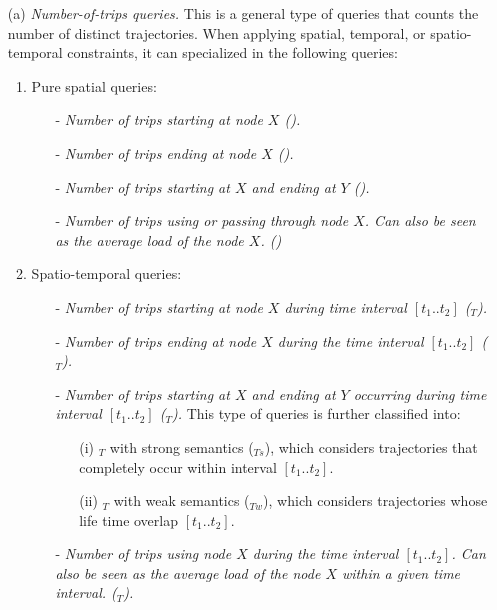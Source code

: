 	\begin{itemize}
		\item[(a)] {\em Number-of-trips queries.} This is a general type of queries that counts the number of distinct trajectories. When applying spatial, temporal, or spatio-temporal constraints, it can specialized in the following queries:
		
		\begin{enumerate}
			\item Pure spatial queries:
			\begin{itemize}
				\item[-] {\em Number of trips starting at node $X$ (\startX).}
				\item[-] {\em Number of trips ending at node $X$ (\endX).} 
				\item[-] {\em Number of trips starting at $X$ and ending at $Y$ (\XtoY).}
				\item[-] {\em Number of trips using or passing through node $X$. Can also be seen as the average load of the node $X$. (\loadX)}
			\end{itemize}
			
			\item Spatio-temporal queries:
			\begin{itemize}
				\item[-] {\em Number of trips starting at node $X$ during time interval $[t_1..t_2]$ (\startX$_T$).}
				\item[-] {\em Number of trips ending at node $X$ during the time interval $[t_1..t_2]$ (\endX$_T$). }
				\item[-] {\em Number of trips starting at $X$ and ending at $Y$ occurring during  time interval $[t_1..t_2]$ (\XtoY$_T$).} This type of queries is further classified into: 
				\begin{itemize}
				    \item[(i)] \XtoY$_T$ with strong semantics (\XtoY$_{Ts}$), which considers trajectories that completely occur within interval $[t_1..t_2]$.
				    \item[(ii)] \XtoY$_T$ with weak semantics (\XtoY$_{Tw}$), which considers trajectories whose life time overlap $[t_1..t_2]$.
				\end{itemize}
				\item[-] {\em Number of trips using node $X$ during the time interval $[t_1..t_2]$. Can also be seen as the average load of the node $X$ within a given time interval. (\loadX$_T$).}
			\end{itemize}
			

\end{enumerate}
\end{itemize}
